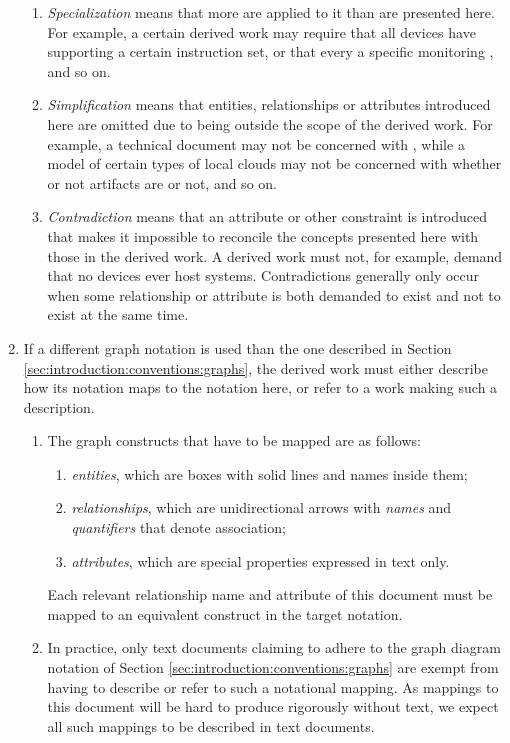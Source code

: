 \begin{enumerate}
\begin{enumerate}
	\item \textit{Specialization} means that more  are applied to it than are presented here. For example, a certain derived work may require that all devices have  supporting a certain instruction set, or that every   a specific monitoring , and so on.
	\item \textit{Simplification} means that entities, relationships or attributes introduced here are omitted due to being outside the scope of the derived work. For example, a technical document may not be concerned with , while a model of certain types of local clouds may not be concerned with whether or not artifacts are  or not, and so on.
	\item \textit{Contradiction} means that an attribute or other constraint is introduced that makes it impossible to reconcile the concepts presented here with those in the derived work. A derived work must not, for example, demand that no devices ever host systems. Contradictions generally only occur when some relationship or attribute is both demanded to exist and not to exist at the same time.
	\end{enumerate}
\item \label{sec:conformance:notation} If a different graph notation is used than the one described in Section \ref{sec:introduction:conventions:graphs}, the derived work must either describe how its notation maps to the notation here, or refer to a work making such a description.
	\begin{enumerate}
	\item The graph constructs that have to be mapped are as follows:
		\begin{enumerate}
		\item \textit{entities}, which are boxes with solid lines and names inside them;
		\item \textit{relationships}, which are unidirectional arrows with \textit{names} and \textit{quantifiers} that denote association;
		\item \textit{attributes}, which are special properties expressed in text only.
		\end{enumerate}
		Each relevant relationship name and attribute of this document must be mapped to an equivalent construct in the target notation.
	\item In practice, only text documents claiming to adhere to the graph diagram notation of Section \ref{sec:introduction:conventions:graphs} are exempt from having to describe or refer to such a notational mapping. As mappings to this document will be hard to produce rigorously without text, we expect all such mappings to be described in text documents.
	\end{enumerate}
\end{enumerate}

